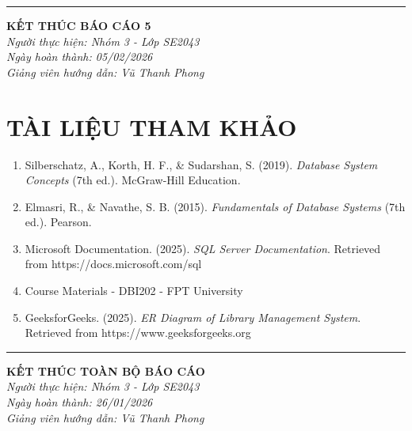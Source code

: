 \documentclass[12pt,a4paper]{article}
\begin{document}
\vspace{1cm}
\begin{center}
\rule{0.6\textwidth}{0.4pt}

\textbf{KẾT THÚC BÁO CÁO 5}\\
\vspace{0.5cm}
\textit{Người thực hiện: Nhóm 3 - Lớp SE2043}\\
\textit{Ngày hoàn thành: 05/02/2026}\\
\textit{Giảng viên hướng dẫn: Vũ Thanh Phong}

\vspace{1cm}


\end{center}

\newpage
\section*{TÀI LIỆU THAM KHẢO}

\begin{enumerate}
    \item Silberschatz, A., Korth, H. F., \& Sudarshan, S. (2019). \textit{Database System Concepts} (7th ed.). McGraw-Hill Education.
    \item Elmasri, R., \& Navathe, S. B. (2015). \textit{Fundamentals of Database Systems} (7th ed.). Pearson.
    \item Microsoft Documentation. (2025). \textit{SQL Server Documentation}. Retrieved from https://docs.microsoft.com/sql
    \item Course Materials - DBI202 - FPT University
    \item GeeksforGeeks. (2025). \textit{ER Diagram of Library Management System}. Retrieved from https://www.geeksforgeeks.org
\end{enumerate}

\vspace{2cm}
\begin{center}
\rule{0.5\textwidth}{0.4pt}

\textbf{KẾT THÚC TOÀN BỘ BÁO CÁO}\\
\vspace{0.5cm}
\textit{Người thực hiện: Nhóm 3 - Lớp SE2043}\\
\textit{Ngày hoàn thành: 26/01/2026}\\
\textit{Giảng viên hướng dẫn: Vũ Thanh Phong}
\end{center}
\end{document}
